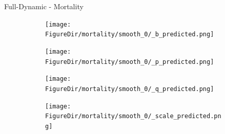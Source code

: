 \documentclass[12pt]{beamer}
\newcommand*{\FigureDir}{../graphs}
\begin{document}
\begin{frame}{Full-Dynamic - Mortality}
\begin{table}[H]
\begin{minipage}[t]{0.33\textwidth}
\begin{figure}[H]
			\begin{subfigure}{\textwidth}
				\centering
				\texttt{[image: \\FigureDir/mortality/smooth\_0/\_b\_predicted.png]}
				\vspace{-3mm}
				\\ 
			\end{subfigure}
		\end{figure}
	\end{minipage}%
	\begin{minipage}[t]{0.33\textwidth}
		\begin{figure}[H]
			\vspace{10mm}
			\begin{subfigure}{\textwidth}
				\centering
				\texttt{[image: \\FigureDir/mortality/smooth\_0/\_p\_predicted.png]}
				\\ 
			\end{subfigure}
		\end{figure}
	\end{minipage}%
	\begin{minipage}[t]{0.33\textwidth}
		\begin{figure}[H]
			\begin{subfigure}{\textwidth}
				\centering
				\texttt{[image: \\FigureDir/mortality/smooth\_0/\_q\_predicted.png]}
				\vspace{-3mm}
				\\ 
			\end{subfigure}

			\begin{subfigure}{\textwidth}
				\centering
				\texttt{[image: \\FigureDir/mortality/smooth\_0/\_scale\_predicted.png]}
				\vspace{-3mm}
				\\ 
			\end{subfigure}
		\end{figure}
	\end{minipage}
	\end{table}

\end{frame}
\end{document}
